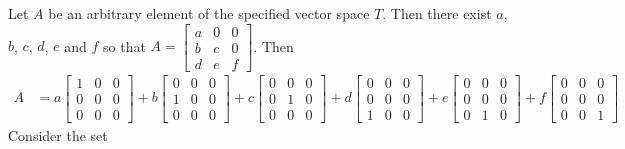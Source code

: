 Let $A$ be an arbitrary element of the specified vector space $T$.  Then there exist $a$, $b$, $c$, $d$, $e$ and $f$ so that 
$A = \begin{bmatrix} a & 0 & 0\\ b &  c & 0\\ d & e & f \end{bmatrix}$.  
Then 
%
\begin{align*}
A &=
a\begin{bmatrix} 1 & 0 & 0 \\ 0 & 0 & 0\\ 0  & 0 & 0 \end{bmatrix} + 
b\begin{bmatrix} 0 & 0 & 0 \\ 1 & 0 & 0\\ 0  & 0 & 0 \end{bmatrix} +
c\begin{bmatrix} 0 & 0 & 0 \\ 0 & 1 & 0\\ 0  & 0 & 0 \end{bmatrix} +
d\begin{bmatrix} 0 & 0 & 0 \\ 0 & 0 & 0\\ 1  & 0 & 0 \end{bmatrix} +
e\begin{bmatrix} 0 & 0 & 0 \\ 0 & 0 & 0\\ 0  & 1 & 0 \end{bmatrix} +
f\begin{bmatrix} 0 & 0 & 0 \\ 0 & 0 & 0\\ 0  & 0 & 1 \end{bmatrix}
\end{align*}
%
Consider the set 
%
